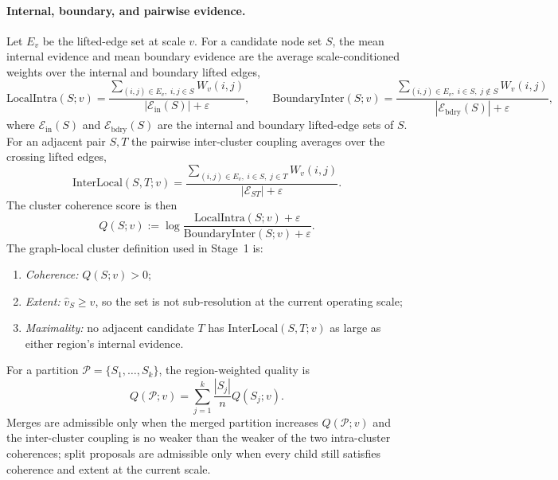 \documentclass[11pt]{article}
\begin{document}
\paragraph{Internal, boundary, and pairwise evidence.}
Let $E_v$ be the lifted-edge set at scale $v$. For a candidate node set $S$,
the mean internal evidence and mean boundary evidence are the average
scale-conditioned weights over the internal and boundary lifted edges,
\[
\mathrm{LocalIntra}(S;v)=
\frac{\sum_{(i,j)\in E_v,\;i,j\in S}W_v(i,j)}
{|\mathcal E_{\mathrm{in}}(S)|+\varepsilon},
\qquad
\mathrm{BoundaryInter}(S;v)=
\frac{\sum_{(i,j)\in E_v,\;i\in S,\;j\notin S}W_v(i,j)}
{|\mathcal E_{\mathrm{bdry}}(S)|+\varepsilon},
\]
where $\mathcal E_{\mathrm{in}}(S)$ and $\mathcal E_{\mathrm{bdry}}(S)$ are the
internal and boundary lifted-edge sets of $S$. For an adjacent pair $S,T$ the
pairwise inter-cluster coupling averages over the crossing lifted edges,
\[
\mathrm{InterLocal}(S,T;v)=
\frac{\sum_{(i,j)\in E_v,\;i\in S,\;j\in T}W_v(i,j)}
{|\mathcal E_{ST}|+\varepsilon}.
\]
The cluster coherence score is then
\[
Q(S;v)
:=
\log\frac{\mathrm{LocalIntra}(S;v)+\varepsilon}
{\mathrm{BoundaryInter}(S;v)+\varepsilon}.
\]
The graph-local cluster definition used in Stage~1 is:
\begin{enumerate}[leftmargin=1.5em]
  \item \emph{Coherence:} $Q(S;v)>0$;
  \item \emph{Extent:} $\hat v_S\ge v$, so the set is not sub-resolution at the
  current operating scale;
  \item \emph{Maximality:} no adjacent candidate $T$ has
  $\mathrm{InterLocal}(S,T;v)$ as large as either region's internal evidence.
\end{enumerate}
For a partition $\mathcal P=\{S_1,\dots,S_k\}$, the region-weighted quality is
\[
Q(\mathcal P;v)=\sum_{j=1}^k\frac{|S_j|}{n}Q(S_j;v).
\]
Merges are admissible only when the merged partition increases
$Q(\mathcal P;v)$ and the inter-cluster coupling is no weaker than the weaker
of the two intra-cluster coherences; split proposals are admissible only when
every child still satisfies coherence and extent at the current scale.
\end{document}
